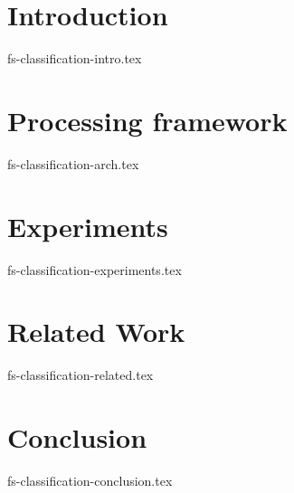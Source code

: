\documentclass[sigconf]{acmart}
\theoremstyle{remark}
\begin{document}
\thispagestyle{empty}

\section {Introduction}
 {fs-classification-intro.tex}

\section {Processing framework}
 {fs-classification-arch.tex}

\section {Experiments}
 {fs-classification-experiments.tex}

\section{Related Work}
 {fs-classification-related.tex}

\section {Conclusion}
 {fs-classification-conclusion.tex}



\end{document}
